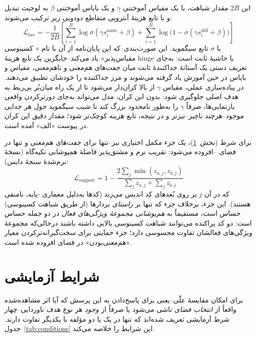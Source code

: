 این
$2B$
مقدار شباهت، با یک مقیاس آموختنی
$\gamma$
و یک بایاس آموختنی
$\beta$
به لوجیت تبدیل و با تابع هزینهٔ آنتروپی متقاطع دودویی زیر ترکیب می‌شوند:
\begin{equation}
\mathcal{L}_{\mathrm{bce}} = -\frac{1}{2B}\left[
\sum_{i=1}^{B} \log \sigma(\gamma s_i^{\mathrm{same}} + \beta)
+ \sum_{i=1}^{B} \log\big(1 - \sigma(\gamma s_i^{\mathrm{diff}} + \beta)\big)
\right]
\end{equation}
با
$\sigma$
تابع سیگموید. این صورت‌بندی--که این پایان‌نامه از آن با نام « کسینوسی مقیاس‌پذیر» یاد می‌کند--جایگزین یک تابع هزینهٔ hinge با حاشیهٔ ثابت است: به‌جای تعریف دستی یک آستانهٔ جداکنندهٔ ثابت میان جفت‌های هم‌معنی و ناهم‌معنی، مقیاس و بایاس در حین آموزش یاد گرفته می‌شوند و مرز جداکننده را خودشان تطبیق می‌دهند. در پیاده‌سازی عملی، مقیاس
$\gamma$
از بالا کران‌دار می‌شود تا از یک راه میان‌بُر بی‌ربط به هدف اصلی جلوگیری شود: بدون این کران، مدل می‌تواند به‌جای دورترکردن واقعی بازنمایی‌ها، صرفاً
$\gamma$
را به‌طور نامحدود بزرگ کند تا شیب سیگموید حول هر جدایی موجود--هرچند ناچیز--تیزتر و در نتیجه، تابع هزینه کوچک‌تر شود؛ مقدار دقیق این کران در پیوست «الف» آمده است.

برای شرط
 (بخش~\ref{sec:conditions})، یک جزء مکمل اختیاری نیز--تنها برای جفت‌های هم‌معنی و تنها در فضای
--افزوده می‌شود: تقریب نرم و مشتق‌پذیر فاصلهٔ همپوشانی تکیه‌گاه
(نسخهٔ نرم‌شدهٔ سنجهٔ دایس):
\begin{equation}
\mathcal{L}_{\mathrm{support}} = 1 - \frac{2\sum_j \min(z_{a,j}, z_{b,j})}{\sum_j z_{a,j} + \sum_j z_{b,j}}
\end{equation}
که در آن
$j$
بر روی بُعدهای کد
اندیس می‌زند (کدها به‌دلیل معماری
-پایه، نامنفی هستند). این جزء، برخلاف جزء
که تنها بر \emph{راستای}
بردارها (از طریق شباهت کسینوسی) حساس است، مستقیماً به \emph{هم‌پوشانی مجموعهٔ ویژگی‌های فعال} در دو جمله حساس است: دو کد پراکنده می‌توانند شباهت کسینوسی بالایی داشته باشند درحالی‌که مجموعهٔ ویژگی‌های فعالشان تفاوت محسوسی دارد؛ جزء حمایتی برای سخت‌گیرانه‌ترکردن معیار «هم‌معنی‌بودن» در فضای
افزوده شده است.

\section{شرایط آزمایشی}
\label{sec:conditions}
برای امکان مقایسهٔ علّی--یعنی برای پاسخ‌دادن به این پرسش که آیا اثر مشاهده‌شده واقعاً از \emph{انتخاب فضای}
ناشی می‌شود یا صرفاً از \emph{وجود} هر نوع هدف ناوردایی--چهار شرط آزمایشی تعریف شده‌اند که تنها در یک یا دو مؤلفه با یکدیگر تفاوت دارند. جدول~\ref{tab:conditions} این شرایط را خلاصه می‌کند.

